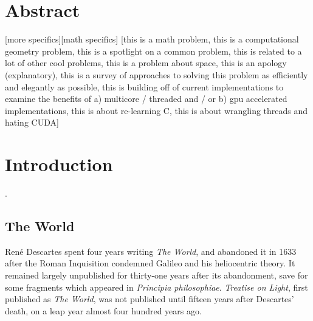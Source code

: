 \documentclass[12pt,twoside]{reedthesis}
\begin{document}
    \tableofcontents
    \listofalgorithms
    \listoffigures

    \chapter*{Abstract}
    [more specifics][math specifics]
    [this is a math problem, this is a computational geometry problem, this is a spotlight on a common problem, this is related to a lot of other cool problems, this is a problem about space, this is an apology (explanatory), this is a survey of approaches to solving this problem as efficiently and elegantly as possible, this is building off of current implementations to examine the benefits of a) multicore / threaded and / or b) gpu accelerated implementations, this is about re-learning C, this is about wrangling threads and hating CUDA]
	

  \mainmatter %
  \pagestyle{fancyplain} %


  \chapter*{Introduction}
    \setcounter{chapter}{1}
    \setcounter{section}{0}

  \citep[][p. 21]{descartes}.

  \section{The World} %
  \label{sec:the_world}
    Ren\'{e} Descartes spent four years writing \emph{The World}, and abandoned it in 1633 after the Roman Inquisition condemned Galileo and his heliocentric theory. It remained largely unpublished for thirty-one years after its abandonment, save for some fragments which appeared in \emph{Principia philosophiae}. \emph{Treatise on Light}, first published as \emph{The World}, was not published until fifteen years after Descartes' death, on a leap year almost four hundred years ago. \par
\end{document}
